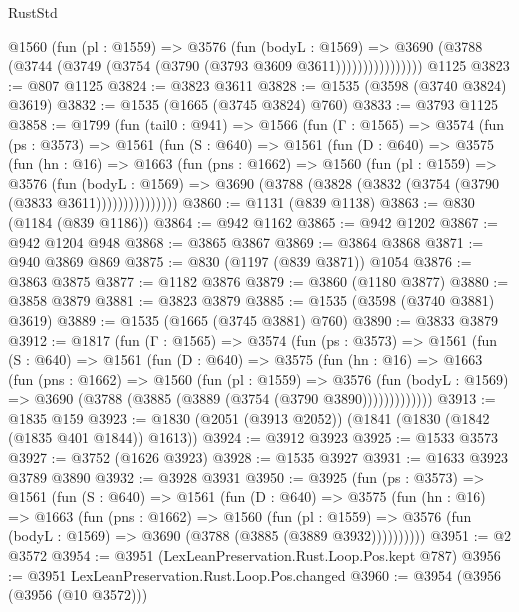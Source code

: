 \begin{lexlean}{RustStd}
\begin{coremodule}
                  @1560
                    (fun (pl : @1559) =>
                    @3576
                      (fun (bodyL : @1569) =>
                      @3690 (@3788 (@3744 (@3749 (@3754 (@3790 (@3793 @3609 @3611))))))))))))))))
    @1125
@3823 := @807 @1125
@3824 := @3823 @3611
@3828 := @1535 (@3598 (@3740 @3824) @3619)
@3832 := @1535 (@1665 (@3745 @3824) @760)
@3833 := @3793 @1125
@3858 := @1799
    (fun (tail0 : @941) =>
    @1566
      (fun (Γ : @1565) =>
      @3574
        (fun (ps : @3573) =>
        @1561
          (fun (S : @640) =>
          @1561
            (fun (D : @640) =>
            @3575
              (fun (hn : @16) =>
              @1663
                (fun (pns : @1662) =>
                @1560
                  (fun (pl : @1559) =>
                  @3576
                    (fun (bodyL : @1569) =>
                    @3690 (@3788 (@3828 (@3832 (@3754 (@3790 (@3833 @3611)))))))))))))))
@3860 := @1131 (@839 @1138)
@3863 := @830 (@1184 (@839 @1186))
@3864 := @942 @1162
@3865 := @942 @1202
@3867 := @942 @1204 @948
@3868 := @3865 @3867
@3869 := @3864 @3868
@3871 := @940 @3869 @869
@3875 := @830 (@1197 (@839 @3871)) @1054
@3876 := @3863 @3875
@3877 := @1182 @3876
@3879 := @3860 (@1180 @3877)
@3880 := @3858 @3879
@3881 := @3823 @3879
@3885 := @1535 (@3598 (@3740 @3881) @3619)
@3889 := @1535 (@1665 (@3745 @3881) @760)
@3890 := @3833 @3879
@3912 := @1817
    (fun (Γ : @1565) =>
    @3574
      (fun (ps : @3573) =>
      @1561
        (fun (S : @640) =>
        @1561
          (fun (D : @640) =>
          @3575
            (fun (hn : @16) =>
            @1663
              (fun (pns : @1662) =>
              @1560
                (fun (pl : @1559) =>
                @3576
                  (fun (bodyL : @1569) =>
                  @3690 (@3788 (@3885 (@3889 (@3754 (@3790 @3890)))))))))))))
@3913 := @1835 @159
@3923 := @1830 (@2051 (@3913 @2052)) (@1841 (@1830 (@1842 (@1835 @401 @1844)) @1613))
@3924 := @3912 @3923
@3925 := @1533 @3573
@3927 := @3752 (@1626 @3923)
@3928 := @1535 @3927
@3931 := @1633 @3923 @3789 @3890
@3932 := @3928 @3931
@3950 := @3925
    (fun (ps : @3573) =>
    @1561
      (fun (S : @640) =>
      @1561
        (fun (D : @640) =>
        @3575
          (fun (hn : @16) =>
          @1663
            (fun (pns : @1662) =>
            @1560
              (fun (pl : @1559) =>
              @3576 (fun (bodyL : @1569) => @3690 (@3788 (@3885 (@3889 @3932))))))))))
@3951 := @2 @3572
@3954 := @3951 (LexLeanPreservation.Rust.Loop.Pos.kept @787)
@3956 := @3951 LexLeanPreservation.Rust.Loop.Pos.changed
@3960 := @3954 (@3956 (@3956 (@10 @3572)))

\end{coremodule}
\end{lexlean}
